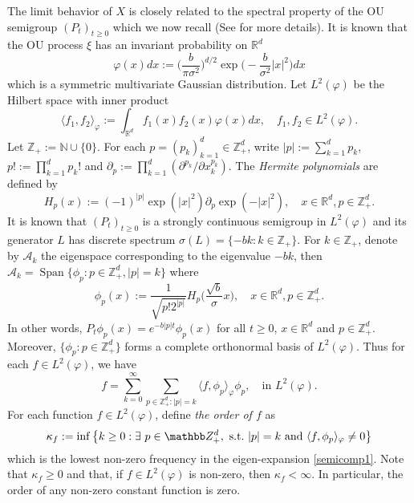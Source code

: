 \documentclass[EJP]{ejpecp} %
\begin{document}
	The limit behavior of $X$  is closely related to the spectral property of the OU semigroup $(P_t)_{t\geq 0}$ which we now recall (See \cite{MetafunePallaraPriola2002Spectrum} for more details).
	It is known that the OU process $\xi$ has an invariant probability on $\mathbb R^d$
\begin{equation}
\label{invariantdensity}
	\varphi(x)dx
	:=\Big (\frac{b}{\pi \sigma^2}\Big )^{d/2}\exp \Big(-\frac{b}{\sigma^2}|x|^2 \Big)dx
\end{equation}
	which is a   symmetric multivariate Gaussian distribution.
	Let $L^2(\varphi)$ be the Hilbert space with inner product
\[
  	\langle f_1, f_2 \rangle_{\varphi}
  	:= \int_{\mathbb R^d}f_1(x)f_2(x)\varphi(x) dx, \quad f_1,f_2 \in L^2(\varphi).
\]
	Let $\mathbb Z_+ := \mathbb N\cup\{0\}$.
	For each $p = (p_k)_{k = 1}^d \in \mathbb{Z}_+^{d}$, write $|p|:=\sum_{k=1}^d p_k$, $p!:= \prod_{k= 1}^d p_k!$ and $\partial_p:= \prod_{k = 1}^d(\partial^{p_k}/\partial x_k^{p_k})$.
	The \emph{Hermite polynomials} are defined by
\[
	H_p(x)
	:=(-1)^{|p|}\exp(|x|^2) \partial_p \exp(-|x|^2),
	\quad x\in \mathbb R^d, p \in \mathbb{Z}_+^{d}.
\]
	It is known that $(P_t)_{t\geq 0}$ is a strongly continuous semigroup in $L^2(\varphi)$ and its generator $L$ has discrete spectrum $\sigma(L)= \{-bk: k \in \mathbb Z_+\}$.
	For $k \in \mathbb Z_+$, denote by $\mathcal{A}_k$ the eigenspace corresponding to the eigenvalue $-bk$, then $ \mathcal{A}_k = \operatorname{Span} \{\phi_p : p\in \mathbb Z_+^d, |p|=k\}$ where
\begin{equation}
\label{eigenfunction}
	\phi_p(x)
  	:= \frac{1}{\sqrt{ p! 2^{|p|} }} H_p \Big(\frac{ \sqrt{b} }{\sigma}x \Big),
  	\quad x\in \mathbb R^d, p\in \mathbb Z_+^d.
\end{equation}
	In other words,
\(
  	P_t\phi_p(x)
  	= e^{-b|p|t}\phi_p(x)
\)
	for all $t\geq 0$, $x\in \mathbb R^d$ and $p\in \mathbb Z_+^d$.
	Moreover, $\{\phi_p: p \in \mathbb Z_+^d\}$ forms a complete orthonormal basis of $L^2(\varphi)$.
	Thus for each $f\in L^2(\varphi)$, we have
\begin{equation}
\label{semicomp1}
  	f
  	= \sum_{k=0}^{\infty}\sum_{p\in \mathbb Z_+^d:|p|=k}\langle f, \phi_p \rangle_{\varphi} \phi_p,
  	\quad \text{in~} L^2(\varphi).
\end{equation}
	For each function $f\in L^2(\varphi)$, define \emph{the order of $f$} as
\[
  	\kappa_f
  	:= \inf \left \{k\geq 0: \exists ~ p\in \mathbb Z_+^d , {\rm ~s.t.~} |p|=k {\rm ~and~}  \langle f, \phi_p \rangle_{\varphi}\neq 0\right \}
\]
	which is the lowest non-zero frequency in the eigen-expansion \eqref{semicomp1}.
	Note that $ \kappa_f\geq 0$ and that, if $f\in L^2(\varphi)$ is
	non-zero, then $\kappa_f<\infty$.
    In particular, the order of any non-zero constant function is zero.
\end{document}
